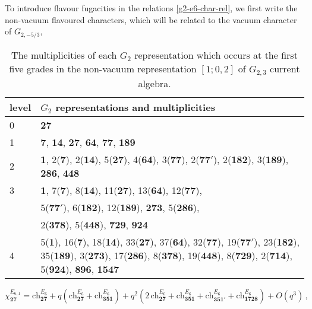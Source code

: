 \documentclass[a4paper,12pt]{article}
\begin{document}
To introduce flavour fugacities in the relations \eqref{g2-e6-char-rel}, we first write the non-vacuum flavoured characters, which will be related to the vacuum character of $G_{2,-5/3}$,
\begin{table}
\centering
\begin{tabular}{ |p{2cm}|p{8cm}|  }
\hline
level & $G_ 2$ representations and multiplicities \\
\hline
0 & {\bf 27} \\
\hline
1 &  {\bf 7}, {\bf 14}, {\bf 27}, {\bf 64}, {\bf 77}, {\bf 189} \\
\hline
2 & {\bf 1}, 2({\bf 7}), 2({\bf 14}), 5({\bf 27}), 4({\bf 64}), 3({\bf 77}),  2({\bf 77$'$}), 2({\bf 182}),  3({\bf 189}), {\bf 286}, {\bf 448}\\
\hline
3 & {\bf 1}, 7({\bf 7}), 8({\bf 14}), 11({\bf 27}), 13({\bf 64}), 12({\bf 77}),\\ &  5({\bf 77$'$}), 6({\bf 182}),  12({\bf 189}), {\bf 273}, 5({\bf 286}),\\ & 2({\bf 378}), 5({\bf 448}), {\bf 729}, {\bf 924}\\
\hline
4 & 5({\bf 1}), 16({\bf 7}), 18({\bf 14}), 33({\bf 27}), 37({\bf 64}), 32({\bf 77}),  19({\bf 77$'$}), 23({\bf 182}),  35({\bf 189}), 3({\bf 273}), 17({\bf 286}), 8({\bf 378}), 19({\bf 448}), 8({\bf 729}), 2({\bf 714}), 5({\bf 924}), {\bf 896}, {\bf 1547}\\
\hline
\end{tabular}
\caption{The multiplicities of each $G_2$ representation which occurs at the first five grades in the non-vacuum representation $[1;0,2]$ of $G_{2,3}$ current algebra.}
\label{table: g2-level-3-reps}
\end{table} 
%
\begin{equation}\label{e6-level1-non-vac}
    \chi^{E_{6,1}}_\mathbf{27}=\mathrm{ch}^{E_6}_\mathbf{27}+q(\mathrm{ch}^{E_6}_\mathbf{27}+\mathrm{ch}^{E_6}_\mathbf{351})+ q^2(2\,\mathrm{ch}^{E_6}_\mathbf{27}+\mathrm{ch}^{E_6}_\mathbf{351}+\mathrm{ch}^{E_6}_\mathbf{351'}+\mathrm{ch}^{E_6}_\mathbf{1728})+\textit{O}(q^3)\, , 
\end{equation}
\end{document}

